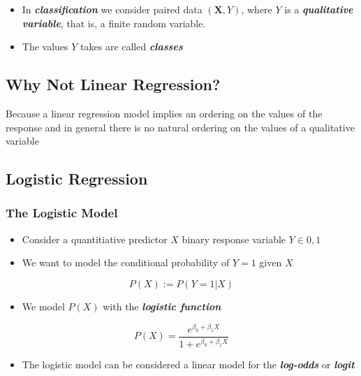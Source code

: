 \documentclass[11pt]{article}
\providecommand{\tightlist}{%
      \setlength{\itemsep}{0pt}\setlength{\parskip}{0pt}}
\begin{document}
    \begin{itemize}
\item
  In \textbf{\emph{classification}} we consider paired data
  \((\mathbf{X}, Y)\), where \(Y\) is a \textbf{\emph{qualitative
  variable}}, that is, a finite random variable.
\item
  The values \(Y\) takes are called \textbf{\emph{classes}}
\end{itemize}

    \hypertarget{why-not-linear-regression}{%
\subsection{Why Not Linear
Regression?}\label{why-not-linear-regression}}

    Because a linear regression model implies an ordering on the values of
the response and in general there is no natural ordering on the values
of a qualitative variable

    \hypertarget{logistic-regression}{%
\subsection{Logistic Regression}\label{logistic-regression}}

    \hypertarget{the-logistic-model}{%
\subsubsection{The Logistic Model}\label{the-logistic-model}}

    \begin{itemize}
\item
  Consider a quantitiative predictor \(X\) binary response variable
  \(Y \in {0,1}\)
\item
  We want to model the conditional probability of \(Y=1\) given \(X\)
\end{itemize}

\[ P(X) := P\left(Y=1 | X\right)\]

\begin{itemize}
\tightlist
\item
  We model \(P(X)\) with the \textbf{\emph{logistic function}}
\end{itemize}

\[ P(X) = \frac{e^{\beta_0 + \beta_1 X}}{1 + e^{\beta_0 + \beta_1 X}} \]

\begin{itemize}
\tightlist
\item
  The logistic model can be considered a linear model for the
  \textbf{\emph{log-odds}} or \textbf{\emph{logit}}
\end{itemize}
\end{document}
